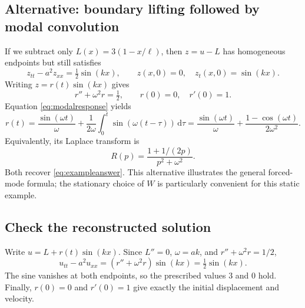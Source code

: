 \documentclass[11pt,a4paper]{article}
\newcommand{\dd}{\,\mathrm{d}}
\begin{document}
\subsection{Alternative: boundary lifting followed by modal convolution}
If we subtract only $L(x)=3(1-x/\ell)$, then $z=u-L$ has homogeneous endpoints
but still satisfies
\begin{equation}
 z_{tt}-a^2z_{xx}=\tfrac12\sin(kx),\qquad z(x,0)=0,\quad z_t(x,0)=\sin(kx).
\end{equation}
Writing $z=r(t)\sin(kx)$ gives
\begin{equation}
 r''+\omega^2r=\tfrac12,\qquad r(0)=0,\quad r'(0)=1.
\end{equation}
Equation \eqref{eq:modalresponse} yields
\begin{equation}
 r(t)=\frac{\sin(\omega t)}\omega
       +\frac1{2\omega}\int_0^t\sin(\omega(t-\tau))\dd\tau
     =\frac{\sin(\omega t)}\omega+\frac{1-\cos(\omega t)}{2\omega^2}.
\end{equation}
Equivalently, its Laplace transform is
\begin{equation}
 R(p)=\frac{1+1/(2p)}{p^2+\omega^2}.
\end{equation}
Both recover \eqref{eq:exampleanswer}. This alternative illustrates the general
forced-mode formula; the stationary choice of $W$ is particularly convenient
for this static example.

\subsection{Check the reconstructed solution}
Write $u=L+r(t)\sin(kx)$. Since $L''=0$, $\omega=ak$, and $r''+\omega^2r=1/2$,
\begin{equation}
 u_{tt}-a^2u_{xx}=(r''+\omega^2r)\sin(kx)
            =\tfrac12\sin(kx).
\end{equation}
The sine vanishes at both endpoints, so the prescribed values $3$ and $0$ hold.
Finally, $r(0)=0$ and $r'(0)=1$ give exactly the initial displacement and velocity.
\end{document}
